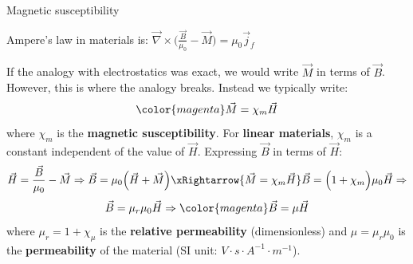 \begin{frame}{Magnetic susceptibility}

Ampere's law in materials is:
$\displaystyle \vec{\nabla} \times \Big( \frac{\vec{B}}{\mu_0} - \vec{M} \Big) = \mu_0 \vec{j}_{f}$\\
\vspace{0.1cm}

If the analogy with electrostatics was exact,
we would write $\vec{M}$ in terms of $\vec{B}$.
However, this is where the analogy breaks.
Instead we typically write:
\begin{equation*}
{\color{magenta}
  \vec{M} = \chi_{m} \vec{H}
}
\end{equation*}
where  $\chi_m$ is the {\bf magnetic susceptibility}.
For {\bf linear materials}, $\chi_m$ is a constant independent of the value of $\vec{H}$.
Expressing $\vec{B}$ in terms of $\vec{H}$:
\begin{equation*}
  \vec{H} = \frac{\vec{B}}{\mu_0} - \vec{M} \Rightarrow
  \vec{B} = \mu_0 \Big( \vec{H} + \vec{M} \Big) \xRightarrow{\vec{M} = \chi_{m} \vec{H}}
  \vec{B} = \Big(1 + \chi_{m} \Big) \mu_0  \vec{H} \Rightarrow
\end{equation*}
\begin{equation*}
  \vec{B} = \mu_r \mu_0 \vec{H} \Rightarrow
  {\color{magenta}
    \vec{B} = \mu \vec{H}
  }
\end{equation*}
where $\mu_r = 1+\chi_{\mu}$
is the {\bf relative permeability} (dimensionless) and
$\mu = \mu_r  \mu_0$ is the {\bf permeability} of the material
(SI unit: $V \cdot s \cdot  A^{-1} \cdot m^{-1}$).\\

\end{frame}


%
%
%

